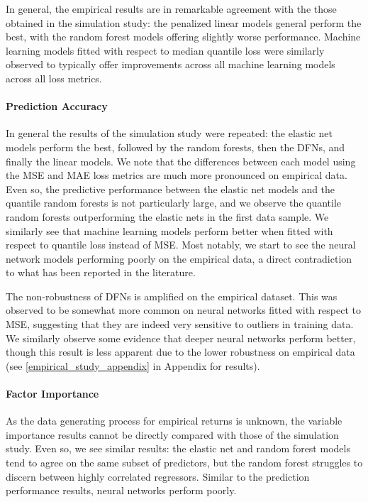 \documentclass{article}
\begin{document}
In general, the empirical results are in remarkable agreement with the those obtained in the simulation study: the penalized linear models general perform the best, with the random forest models offering slightly worse performance. Machine learning models fitted with respect to median quantile loss were similarly observed to typically offer improvements across all machine learning models across all loss metrics. 

\paragraph{Prediction Accuracy}
In general the results of the simulation study were repeated: the elastic net models perform the best, followed by the random forests, then the DFNs, and finally the linear models. We note that the differences between each model using the MSE and MAE loss metrics are much more pronounced on empirical data. Even so, the predictive performance between the elastic net models and the quantile random forests is not particularly large, and we observe the quantile random forests outperforming the elastic nets in the first data sample. We similarly see that machine learning models perform better when fitted with respect to quantile loss instead of MSE. Most notably, we start to see the neural network models performing poorly on the empirical data, a direct contradiction to what has been reported in the literature.



The non-robustness of DFNs is amplified on the empirical dataset. This was observed to be somewhat more common on neural networks fitted with respect to MSE, suggesting that they are indeed very sensitive to outliers in training data. We similarly observe some evidence that deeper neural networks perform better, though this result is less apparent due to the lower robustness on empirical data (see \ref{empirical_study_appendix} in Appendix for results).


\paragraph{Factor Importance}
As the data generating process for empirical returns is unknown, the variable importance results cannot be directly compared with those of the simulation study. Even so, we see similar results: the elastic net and random forest models tend to agree on the same subset of predictors, but the random forest struggles to discern between highly correlated regressors. Similar to the prediction performance results, neural networks perform poorly.
\end{document}
